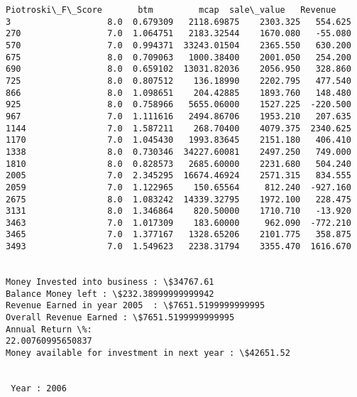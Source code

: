 \documentclass[11pt]{article}
\begin{document}
\begin{Verbatim}[commandchars=\\\{\}]
      Piotroski\_F\_Score       btm         mcap  sale\_value   Revenue
3                   8.0  0.679309   2118.69875    2303.325   554.625
270                 7.0  1.064751   2183.32544    1670.080   -55.080
570                 7.0  0.994371  33243.01504    2365.550   630.200
675                 8.0  0.709063   1000.38400    2001.050   254.200
690                 8.0  0.659102  13031.82036    2056.950   328.860
725                 8.0  0.807512    136.18990    2202.795   477.540
866                 8.0  1.098651    204.42885    1893.760   148.480
925                 8.0  0.758966   5655.06000    1527.225  -220.500
967                 7.0  1.111616   2494.86706    1953.210   207.635
1144                7.0  1.587211    268.70400    4079.375  2340.625
1170                7.0  1.045430   1993.83645    2151.180   406.410
1338                8.0  0.730346  34227.60081    2497.250   749.000
1810                8.0  0.828573   2685.60000    2231.680   504.240
2005                7.0  2.345295  16674.46924    2571.315   834.555
2059                7.0  1.122965    150.65564     812.240  -927.160
2675                8.0  1.083242  14339.32795    1972.100   228.475
3131                8.0  1.346864    820.50000    1710.710   -13.920
3463                7.0  1.017309    183.60000     962.090  -772.210
3465                7.0  1.377167   1328.65206    2101.775   358.875
3493                7.0  1.549623   2238.31794    3355.470  1616.670


Money Invested into business : \$34767.61
Balance Money left : \$232.38999999999942
Revenue Earned in year 2005  : \$7651.5199999999995
Overall Revenue Earned : \$7651.5199999999995
Annual Return \%:
22.00760995650837
Money available for investment in next year : \$42651.52


 Year : 2006


\end{Verbatim}
\end{document}
